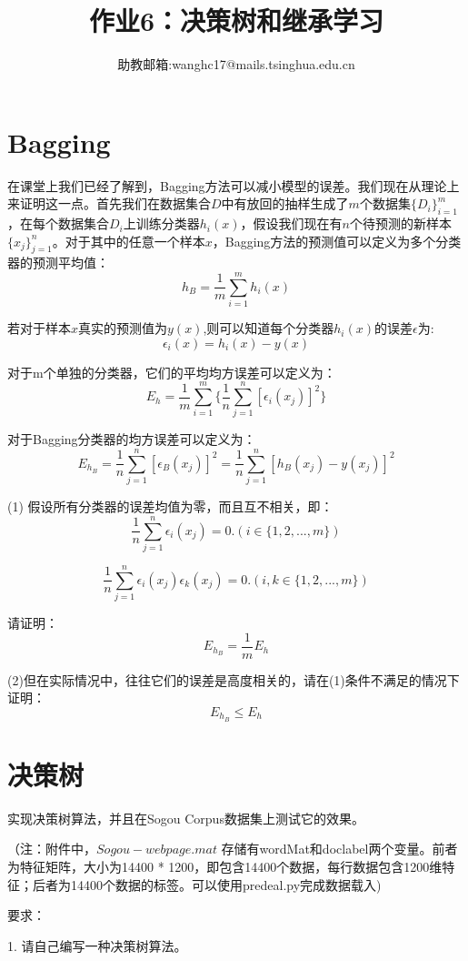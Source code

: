 \documentclass[UTF8]{ctexart}
\title{作业6：决策树和继承学习}
\author{助教邮箱:wanghc17@mails.tsinghua.edu.cn}
\date{}
\begin{document}
\maketitle

\section{Bagging}

在课堂上我们已经了解到，Bagging方法可以减小模型的误差。我们现在从理论上来证明这一点。首先我们在数据集合$D$中有放回的抽样生成了$m$个数据集$\{D_{i}\}_{i=1}^{m}$，在每个数据集合$D_{i}$上训练分类器$h_{i}(x)$，假设我们现在有$n$个待预测的新样本$\{x_{j}\}_{j=1}^{n}$。对于其中的任意一个样本$x$，Bagging方法的预测值可以定义为多个分类器的预测平均值：
$$
h_{B} = \frac{1}{m}\sum_{i=1}^{m}h_{i}(x)
$$

若对于样本$x$真实的预测值为$y(x)$,则可以知道每个分类器$h_{i}(x)$的误差$\epsilon$为:
$$
\epsilon_{i}(x) = h_{i}(x) - y(x)
$$

对于m个单独的分类器，它们的平均均方误差可以定义为：
$$
E_{h} = \frac{1}{m}\sum_{i=1}^{m}\{\frac{1}{n}\sum_{j=1}^{n}[\epsilon_{i}(x_{j})]^{2}\}
$$

对于Bagging分类器的均方误差可以定义为：
$$
E_{h_{B}} = \frac{1}{n}\sum_{j=1}^{n}[\epsilon_{B}(x_{j})]^{2} = \frac{1}{n}\sum_{j=1}^{n}[h_{B}(x_{j}) - y(x_{j})]^{2}
$$

(1) 假设所有分类器的误差均值为零，而且互不相关，即：
$$
\frac{1}{n}\sum_{j=1}^{n}\epsilon_{i}(x_{j}) = 0.(i\in\{1,2,...,m\})
$$

$$
\frac{1}{n}\sum_{j=1}^{n}\epsilon_{i}(x_{j}) \epsilon_{k}(x_{j})= 0.(i,k\in\{1,2,...,m\})
$$

请证明：
$$
E_{h_{B}} = \frac{1}{m}E_{h}
$$

(2)但在实际情况中，往往它们的误差是高度相关的，请在(1)条件不满足的情况下证明：
$$
E_{h_{B}} \leq E_{h}
$$




\section{决策树}
实现决策树算法，并且在Sogou Corpus数据集上测试它的效果。

（注：附件中，$Sogou-webpage.mat$ 存储有wordMat和doclabel两个变量。前者为特征矩阵，大小为14400 * 1200，即包含14400个数据，每行数据包含1200维特征；后者为14400个数据的标签。可以使用predeal.py完成数据载入)

要求：

1. 请自己编写一种决策树算法。
\end{document}
